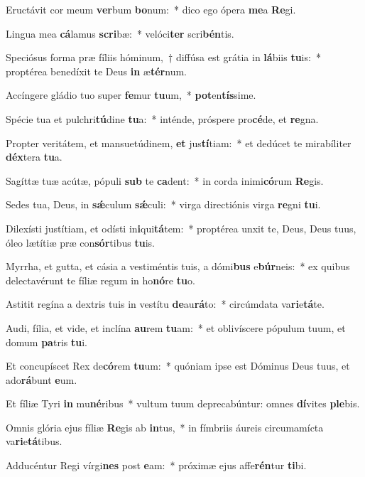 \item Eructávit cor meum \textbf{ver}bum \textbf{bo}num:~* dico ego ópera \textbf{me}a \textbf{Re}gi.
\item Lingua mea \textbf{cá}lamus \textbf{scri}bæ:~* velóci\textbf{ter} scri\textbf{bén}tis.
\item Speciósus forma præ fíliis hóminum,~† diffúsa est grátia in \textbf{lá}biis \textbf{tu}is:~* proptérea benedíxit te Deus \textbf{in} æ\textbf{tér}num.
\item Accíngere gládio tuo super \textbf{fe}mur \textbf{tu}um,~* \textbf{pot}en\textbf{tís}sime.
\item Spécie tua et pulchri\textbf{tú}dine \textbf{tu}a:~* inténde, próspere pro\textbf{cé}de, et \textbf{re}gna.
\item Propter veritátem, et mansuetúdinem, \textbf{et} jus\textbf{tí}tiam:~* et dedúcet te mirabíliter \textbf{déx}tera \textbf{tu}a.
\item Sagíttæ tuæ acútæ, pópuli \textbf{sub} te \textbf{ca}dent:~* in corda inimi\textbf{có}rum \textbf{Re}gis.
\item Sedes tua, Deus, in \textbf{sǽ}culum \textbf{sǽ}culi:~* virga directiónis virga \textbf{re}gni \textbf{tu}i.
\item Dilexísti justítiam, et odísti in\textbf{i}qui\textbf{tá}tem:~* proptérea unxit te, Deus, Deus tuus, óleo lætítiæ præ con\textbf{sór}tibus \textbf{tu}is.
\item Myrrha, et gutta, et cásia a vestiméntis tuis, a dómi\textbf{bus} e\textbf{búr}neis:~* ex quibus delectavérunt te fíliæ regum in ho\textbf{nó}re \textbf{tu}o.
\item Astitit regína a dextris tuis in vestítu \textbf{de}au\textbf{rá}to:~* circúmdata va\textbf{ri}e\textbf{tá}te.
\item Audi, fília, et vide, et inclína \textbf{au}rem \textbf{tu}am:~* et oblivíscere pópulum tuum, et domum \textbf{pa}tris \textbf{tu}i.
\item Et concupíscet Rex de\textbf{có}rem \textbf{tu}um:~* quóniam ipse est Dóminus Deus tuus, et ado\textbf{rá}bunt \textbf{e}um.
\item Et fíliæ Tyri \textbf{in} mu\textbf{né}ribus~* vultum tuum deprecabúntur: omnes \textbf{dí}vites \textbf{ple}bis.
\item Omnis glória ejus fíliæ \textbf{Re}gis ab \textbf{in}tus,~* in fímbriis áureis circumamícta va\textbf{ri}e\textbf{tá}tibus.
\item Adducéntur Regi vírgi\textbf{nes} post \textbf{e}am:~* próximæ ejus affe\textbf{rén}tur \textbf{ti}bi.
